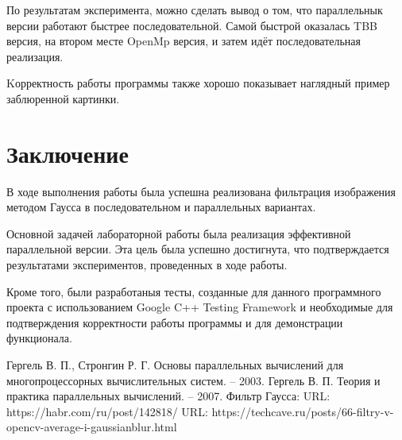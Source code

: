 \documentclass{report}
\begin{document}
По результатам эксперимента, можно сделать вывод о том, что параллельнык версии работают быстрее последовательной. Самой быстрой оказалась TBB версия, на втором месте OpenMp версия, и затем идёт последовательная реализация.
\par
Kорректность работы программы также хорошо показывает наглядный пример заблюренной картинки.
\newpage

\section*{Заключение}
В ходе выполнения работы была успешна реализована фильтрация изображения методом Гаусса в последовательном и параллельных вариантах. 
\par 
Основной задачей лабораторной работы была реализация эффективной параллельной версии. Эта цель была успешно достигнута, что подтверждается результатами экспериментов, проведенных в ходе работы. 
\par 
Кроме того, были разработаныя тесты, созданные для данного программного проекта с использованием Google C++ Testing Framework и необходимые для подтверждения корректности работы программы и для демонстрации функционала.
\newpage

\begin{thebibliography}{1}
Гергель В. П., Стронгин Р. Г. Основы параллельных вычислений для многопроцессорных вычислительных систем. – 2003.
Гергель В. П. Теория и практика параллельных вычислений. – 2007. 
Фильтр Гаусса: URL: https://habr.com/ru/post/142818/
URL: https://techcave.ru/posts/66-filtry-v-opencv-average-i-gaussianblur.html
\end{thebibliography}
\newpage

\end{document}
